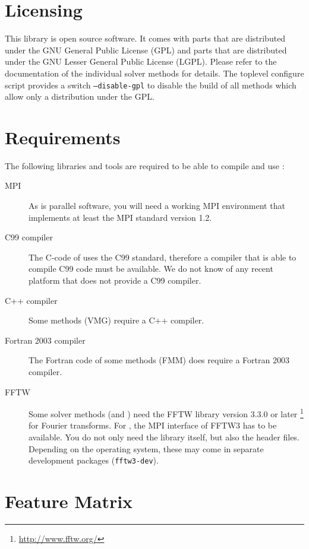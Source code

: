 \section{Licensing}

This library is open source software.  It comes with parts that are
distributed under the GNU General Public License (GPL) and parts that
are distributed under the GNU Lesser General Public License (LGPL).
Please refer to the documentation of the individual solver methods for
details.  The toplevel configure script provides a switch
\texttt{--disable-gpl} to disable the build of all methods which allow
only a distribution under the GPL.


\section{Requirements}
\label{sec:requirements}

The following libraries and tools are required to be able to compile
and use \fcs:

\begin{description}
\item[MPI]  As \fcs is parallel software, you will need a
  working MPI environment that implements at least the MPI standard
  version 1.2.
\item[C99 compiler]  The C-code of \fcs uses the C99
  standard, therefore a compiler that is able to compile C99 code must
  be available. We do not know of any recent platform that does not
  provide a C99 compiler.
\item[C++ compiler]  Some methods (\eg VMG) require a C++
  compiler.
\item[Fortran 2003 compiler]  The Fortran code of
  some methods (\eg FMM) does require a Fortran 2003 compiler.
\item[FFTW]  Some solver methods (\eg \pthreem and \ptwonfft)
  need the FFTW library version 3.3.0 or later
  \footnote{\url{http://www.fftw.org/}} for Fourier transforms.  For
  \ptwonfft, the MPI interface of FFTW3 has to be available. You do
  not only need the library itself, but also the header files.
  Depending on the operating system, these may come in separate
  development packages (\eg \texttt{fftw3-dev}).
\end{description}

\section{Feature Matrix}
\label{sec:feature_matrix}

